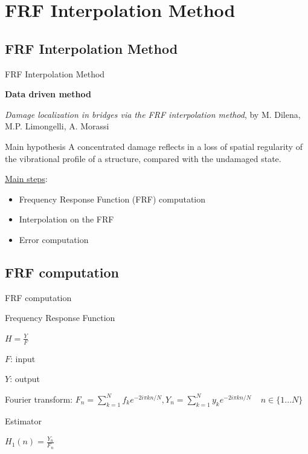 \documentclass{beamer}
\begin{document}


\section{FRF Interpolation Method}

\subsection{FRF Interpolation Method}
\begin{frame}{FRF Interpolation Method}

\begin{center}
\textbf{Data driven method}

\textit{Damage localization in bridges via the FRF interpolation method}, by M. Dilena, M.P. Limongelli, A. Morassi
\end{center}

\pause

\begin{alertblock}{Main hypothesis}
A concentrated damage reflects
in a loss of spatial regularity of the vibrational profile of a
structure, compared with the undamaged state.
\end{alertblock}

\pause

\underline{Main steps}:
\begin{itemize}
\item Frequency Response Function (FRF) computation
\item Interpolation on the FRF
\item Error computation
\end{itemize}


\end{frame}


\subsection{FRF computation}
\begin{frame}{FRF computation}
\begin{exampleblock}{Frequency Response Function}
\begin{center}
$H = \frac{Y}{F}$
\end{center}
$F$: input

$Y$: output
\end{exampleblock}

\pause

Fourier transform:
$
F_n = \sum\limits_{k=1}^N f_k e^{-2i\pi kn/N},
Y_n = \sum\limits_{k=1}^N y_k e^{-2i\pi kn/N} \ \ \ \ \ n \in \{1 ... N\}
$


\begin{block}{Estimator}
\begin{center}
$H_1(n) = \frac{Y_n}{F_n}$
\end{center}
\end{block}

\end{frame}
\end{document}
